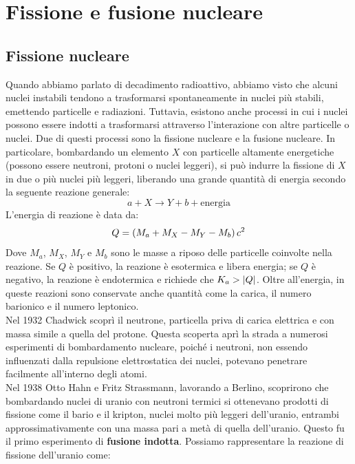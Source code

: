 \chapter{Fissione e fusione nucleare}
\section{Fissione nucleare}
Quando abbiamo parlato di decadimento radioattivo, abbiamo visto che alcuni nuclei instabili tendono a trasformarsi spontaneamente in nuclei più stabili, emettendo particelle e radiazioni. Tuttavia, esistono anche processi in cui i nuclei possono essere indotti a trasformarsi attraverso l'interazione con altre particelle o nuclei. Due di questi processi sono la fissione nucleare e la fusione nucleare. In particolare, bombardando un elemento $X$ con particelle altamente energetiche (possono essere neutroni, protoni o nuclei leggeri), si può indurre la fissione di $X$ in due o più nuclei più leggeri, liberando una grande quantità di energia secondo la seguente reazione generale:
\begin{equation}
    a + X \rightarrow Y + b + \text{energia}
\end{equation}
L'energia di reazione è data da:
\begin{equation}
    Q = \left(M_a + M_X - M_Y - M_b\right) c^2
\end{equation}
Dove $M_a$, $M_X$, $M_Y$ e $M_b$ sono le masse a riposo delle particelle coinvolte nella reazione. Se $Q$ è positivo, la reazione è esotermica e libera energia; se $Q$ è negativo, la reazione è endotermica e richiede che $K_a > \abs{Q}$. Oltre all'energia, in queste reazioni sono conservate anche quantità come la carica, il numero barionico e il numero leptonico.\\
Nel 1932 Chadwick scoprì il neutrone, particella priva di carica elettrica e con massa simile a quella del protone. Questa scoperta aprì la strada a numerosi esperimenti di bombardamento nucleare, poiché i neutroni, non essendo influenzati dalla repulsione elettrostatica dei nuclei, potevano penetrare facilmente all'interno degli atomi.\\
Nel 1938 Otto Hahn e Fritz Strassmann, lavorando a Berlino, scoprirono che bombardando nuclei di uranio con neutroni termici si ottenevano prodotti di fissione come il bario e il kripton, nuclei molto più leggeri dell'uranio, entrambi approssimativamente con una massa pari a metà di quella dell'uranio. Questo fu il primo esperimento di \textbf{fusione indotta}. Possiamo rappresentare la reazione di fissione dell'uranio come:
